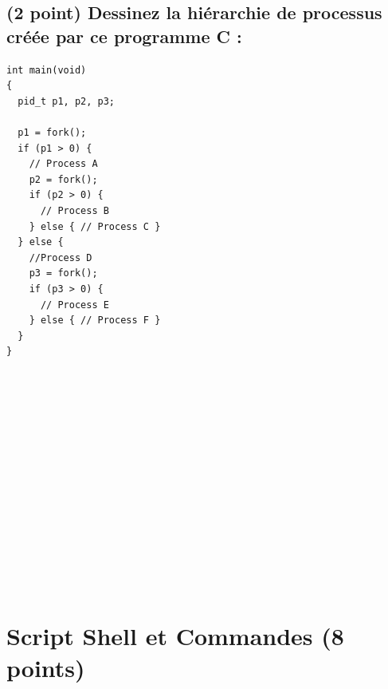 \documentclass[11pt,a4paper]{article}
\begin{document}
\bigskip
\bigskip  %
\bigskip  %
\bigskip
\bigskip

\newpage

\subsection{(2 point) Dessinez la hiérarchie de processus créée par ce programme C :}

%

\noindent\begin{minipage}{.45\textwidth}
\begin{lstlisting}[style=CStyle]
int main(void)
{
  pid_t p1, p2, p3;

  p1 = fork();
  if (p1 > 0) {
    // Process A
    p2 = fork();
    if (p2 > 0) {
      // Process B
    } else { // Process C }
  } else {
    //Process D
    p3 = fork();
    if (p3 > 0) {
      // Process E
    } else { // Process F }
  }
}
\end{lstlisting}
\end{minipage}\hfill
\begin{minipage}{.45\textwidth}
\begin{lstlisting}[showlines=true,backgroundcolor=\color{white},numbersep=5pt,showspaces=false,showstringspaces=false,showtabs=false,tabsize=2]















\end{lstlisting}
\end{minipage}


%
\section{Script Shell et Commandes (8 points)}
\end{document}
